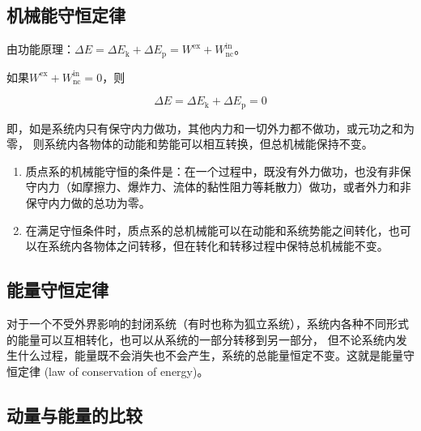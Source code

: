 \documentclass[
	12pt, %
	a4paper, %
]{myLegrandOrangeBook}
\begin{document}
    \subsection{机械能守恒定律}

    \begin{theorem}[机械能守恒定律]

        由功能原理：$\Delta E = \Delta E_{\mathrm{k}} + \Delta E_{\mathrm{p}} =
        W^{\mathrm{ex}} + W_{\mathrm{nc}}^{\mathrm{in}}$。

        如果$W^{\mathrm{ex}} + W_{\mathrm{nc}}^{\mathrm{in}} = 0$，则

        \[
            \Delta E = \Delta E_{\mathrm{k}} + \Delta E_{\mathrm{p}} = 0
        \]

        即，如是系统内只有保守内力做功，其他内力和一切外力都不做功，或元功之和为零，
        则系统内各物体的动能和势能可以相互转换，但总机械能保持不变。

    \end{theorem}

    \begin{enumerate}
        \item 质点系的机械能守恒的条件是：在一个过程中，既没有外力做功，也没有非保守内力（如摩擦力、爆炸力、流体的黏性阻力等耗散力）做功，或者外力和非保守内力做的总功为零。
        \item 在满足守恒条件时，质点系的总机械能可以在动能和系统势能之间转化，也可以在系统内各物体之问转移，但在转化和转移过程中保特总机械能不变。
    \end{enumerate}

    \subsection{能量守恒定律}

    \begin{theorem}[能量守恒定律]

        对于一个不受外界影响的封闭系统（有时也称为狐立系统），系统内各种不同形式的能量可以互相转化，也可以从系统的一部分转移到另一部分，
        但不论系统内发生什么过程，能量既不会消失也不会产生，系统的总能量恒定不变。这就是能量守恒定律 (law of conservation of energy)。

    \end{theorem}

    \subsection{动量与能量的比较}
\end{document}
